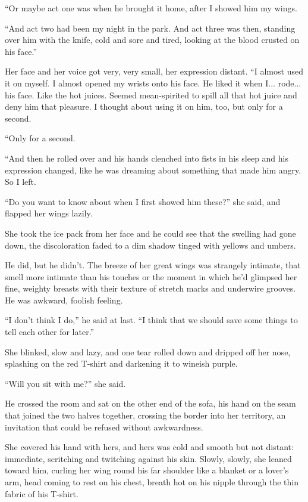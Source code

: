 ``Or maybe act one was when he brought it home, after I showed him my
wings.

``And act two had been my night in the park.  And act three was then,
standing over him with the knife, cold and sore and tired, looking at
the blood crusted on his face.''

Her face and her voice got very, very small, her expression distant. 
``I almost used it on myself.  I almost opened my wrists onto his
face.  He liked it when I...  rode...  his face.  Like the hot juices. 
Seemed mean-spirited to spill all that hot juice and deny him that
pleasure.  I thought about using it on him, too, but only for a
second.

``Only for a second.

``And then he rolled over and his hands clenched into fists in his
sleep and his expression changed, like he was dreaming about something
that made him angry.  So I left.

``Do you want to know about when I first showed him these?'' she said,
and flapped her wings lazily.

She took the ice pack from her face and he could see that the swelling
had gone down, the discoloration faded to a dim shadow tinged with
yellows and umbers.

He did, but he didn't.  The breeze of her great wings was strangely
intimate, that smell more intimate than his touches or the moment in
which he'd glimpsed her fine, weighty breasts with their texture of
stretch marks and underwire grooves.  He was awkward, foolish feeling.

``I don't think I do,'' he said at last.  ``I think that we should
save some things to tell each other for later.''

She blinked, slow and lazy, and one tear rolled down and dripped off
her nose, splashing on the red T-shirt and darkening it to wineish
purple.

``Will you sit with me?'' she said.

He crossed the room and sat on the other end of the sofa, his hand on
the seam that joined the two halves together, crossing the border into
her territory, an invitation that could be refused without
awkwardness.

She covered his hand with hers, and hers was cold and smooth but not
distant:  immediate, scritching and twitching against his skin. 
Slowly, slowly, she leaned toward him, curling her wing round his far
shoulder like a blanket or a lover's arm, head coming to rest on his
chest, breath hot on his nipple through the thin fabric of his
T-shirt.


